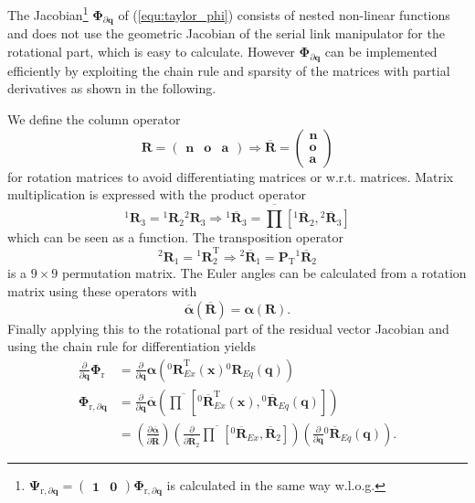 \documentclass[twocolumn,10pt]{IFTOMM}
\newcommand{\bm}[1]{\boldsymbol{#1}}
\newcommand{\rotmat}[2]{{{ }^{#1}\boldsymbol{R}}_{#2}}
\newcommand{\rotmato}[2]{{{ }^{#1}\boldsymbol{\overline{R}}}_{#2}}
\newcommand{\transp}[0]{{\mathrm{T}}}
\begin{document}
The Jacobian\footnote{$\bm{\Psi}_{\mathrm{r},\partial\bm{q}}=\begin{pmatrix} \bm{1} & \bm{0}\end{pmatrix} \bm{\Phi}_{\mathrm{r},\partial\bm{q}}$ is calculated in the same way w.l.o.g.}
$\bm{\Phi}_{\partial\bm{q}}$ of (\ref{equ:taylor_phi}) consists of nested non-linear functions and does not use the geometric Jacobian of the serial link manipulator for the rotational part, which is easy to calculate. 
%
However $\bm{\Phi}_{\partial\bm{q}}$ can be implemented efficiently by exploiting the chain rule and sparsity of the matrices with partial derivatives as shown in the following.

We define the column operator
%
\begin{equation}
\bm{R}=\begin{pmatrix}
\bm{n} & \bm{o} & \bm{a}
\end{pmatrix}
\Rightarrow
\overline{\bm{R}}=\begin{pmatrix}
\bm{n} \\ \bm{o} \\ \bm{a}
\end{pmatrix}
\end{equation}
%
for rotation matrices to avoid differentiating matrices or w.r.t. matrices.
Matrix multiplication is expressed with the product operator
%
\begin{equation}
\rotmat{1}{3}
=
\rotmat{1}{2}
\rotmat{2}{3}
\Rightarrow
\rotmato{1}{3}
=
\overline{\prod}\left[ \rotmato{1}{2}, \rotmato{2}{3}\right]
\label{equ:matprod}
\end{equation}
%
which can be seen as a function. The transposition operator
%
\begin{equation}
\rotmat{2}{1}
=
\rotmat{1}{2}^\transp
\Rightarrow
\rotmato{2}{1}
=
\bm{P}_\transp \rotmato{1}{2}
\end{equation}
%
is a $9 \times 9$ permutation matrix.
The Euler angles can be calculated from a rotation matrix using these operators with
%
\begin{equation}
\overline{\bm{\alpha}}(\overline{\bm{R}})
=
\bm{\alpha}(\bm{R}).
\end{equation}
%
Finally applying this to the rotational part of the residual vector Jacobian and using the chain rule for differentiation yields
%
\begin{align}
\frac{\partial}{\partial \bm{q}}\bm{\Phi}_{\mathrm{r}}
&=
\frac{\partial}{\partial \bm{q}} \bm{\alpha}\left(\rotmat{0}{Ex}^\transp(\bm{x}) \rotmat{0}{Eq}(\bm{q})\right) \label{equ:grad_Phi_q}\\
\bm{\Phi}_{\mathrm{r},\partial\bm{q}}
&=
\frac{\partial}{\partial \bm{q}} \overline{\bm{\alpha}}\left(\overline{\prod}\left[ \rotmato{0}{Ex}^\transp(\bm{x}), \rotmato{0}{Eq}(\bm{q})\right]\right) \nonumber \\
&=
\left(\frac{\partial \overline{\bm{\alpha}}}{\partial \overline{\bm{R}}}\right)
\left(\frac{\partial }{\partial \overline{\bm{R}}_2}
\overline{\prod}\left[\rotmato{0}{Ex}, \overline{\bm{R}}_2\right]\right)
\left(\frac{\partial}{\partial \bm{q}} \rotmato{0}{Eq}(\bm{q})\right).  \nonumber
\end{align}
\end{document}
